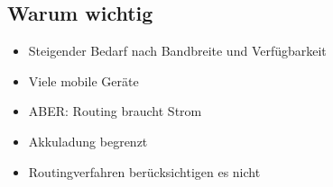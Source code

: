 \documentclass[11pt,handout,notes=only]{beamer}
\begin{document}
%
%

\subsection{Warum wichtig}

\begin{frame}{\insertsubsection}
\begin{itemize}
\item Steigender Bedarf nach Bandbreite und Verfügbarkeit\newline
\item Viele mobile Geräte\newline
\item ABER: Routing braucht Strom\newline
\item Akkuladung begrenzt\newline
\item Routingverfahren berücksichtigen es nicht
\end{itemize}
\end{frame}
\end{document}
